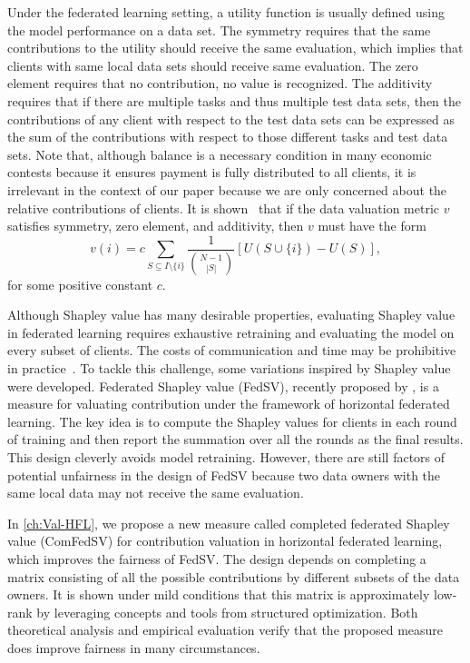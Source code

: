 Under the federated learning setting, a utility function is usually defined using the model performance on a data set. The symmetry requires that the same contributions to the utility should receive the same evaluation, which implies that clients with same local data sets should receive same evaluation. The zero element requires that no contribution, no value is recognized. The additivity requires that if there are multiple tasks and thus multiple test data sets, then the contributions of any client with respect to the test data sets can be expressed as the sum of the contributions with respect to those different tasks and test data sets. Note that, although balance is a necessary condition in many economic contests because it ensures payment is fully distributed to all clients, it is irrelevant in the context of our paper because we are only concerned about the relative contributions of clients. It is shown~\cite{dubey1975uniqueness,ghorbani2019data} that if the data valuation metric $v$ satisfies symmetry, zero element, and additivity, then $v$ must have the form
\begin{equation} \label{eq:shapley}
    v(i) = c \sum\limits_{S \subseteq I \setminus\{i\}} \frac{1}{\binom{N-1}{|S|}} \left[U(S\cup\{i\}) - U(S)\right],
\end{equation}
for some positive constant $c$.  

Although Shapley value has many desirable properties, evaluating Shapley value in federated learning requires exhaustive retraining and evaluating the model on every subset of clients. The costs of communication and time may be prohibitive in practice~\cite{song2019profit}. To tackle this challenge, some variations inspired by Shapley value were developed. Federated Shapley value (FedSV), recently proposed by \citet{wang2020principled}, is a measure for valuating contribution under the framework of horizontal federated learning. The key idea is to compute the Shapley values for clients in each round of training and then report the summation over all the rounds as the final results. This design cleverly avoids model retraining. However, there are still factors of potential unfairness in the design of FedSV because two data owners with the same local data may not receive the same evaluation. 

In \autoref{ch:Val-HFL}, we propose a new measure called completed federated Shapley value (ComFedSV) for contribution valuation in horizontal federated learning, which improves the fairness of FedSV. The design depends on completing a matrix consisting of all the possible contributions by different subsets of the data owners. It is shown under mild conditions that this matrix is approximately low-rank by leveraging concepts and tools from structured optimization. Both theoretical analysis and empirical evaluation verify that the proposed measure does improve fairness in many circumstances.

